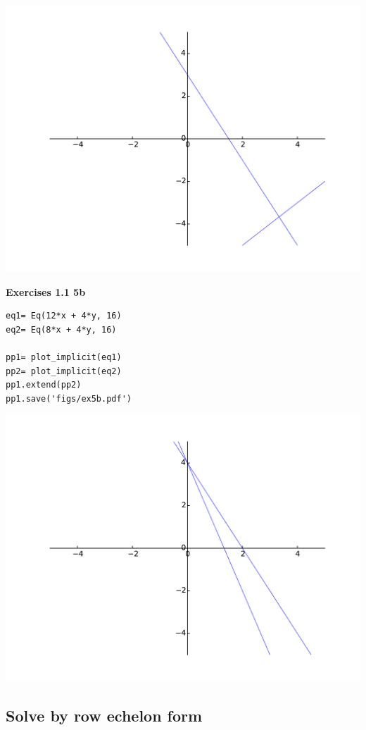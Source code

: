 \documentclass[a4paper]{article}
\begin{document}
\includegraphics[width=\linewidth]{figs/ex4a.pdf}

\textbf{Exercises 1.1 5b}

\begin{verbatim}
eq1= Eq(12*x + 4*y, 16)
eq2= Eq(8*x + 4*y, 16)

pp1= plot_implicit(eq1)
pp2= plot_implicit(eq2)
pp1.extend(pp2)
pp1.save('figs/ex5b.pdf')
\end{verbatim}

\includegraphics[width=\linewidth]{figs/ex5b.pdf}

\subsection{Solve by row echelon form}
\end{document}
